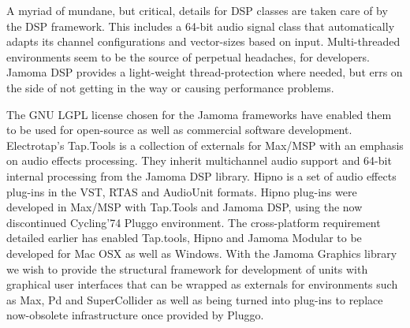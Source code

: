 \documentclass[twoside,10pt]{article}
\begin{document}
A myriad of mundane, but critical, details for DSP classes are taken care of by the DSP framework.  This includes a 64-bit audio signal class that automatically adapts its channel configurations and vector-sizes based on input.  Multi-threaded environments seem to be the source of perpetual headaches, for developers.  Jamoma DSP provides a light-weight thread-protection where needed, but errs on the side of not getting in the way or causing performance problems.




The GNU LGPL license chosen for the Jamoma frameworks have enabled them to be used for open-source as well as commercial software development.  Electrotap's Tap.Tools\cite{web17} is a collection of externals for Max/MSP with an emphasis on audio effects processing.  They inherit multichannel audio support and 64-bit internal processing from the Jamoma DSP library.  Hipno\cite{Place:2005} is a set of audio effects plug-ins in the VST, RTAS and AudioUnit formats.  Hipno plug-ins were developed in Max/MSP with Tap.Tools and Jamoma DSP, using the now discontinued Cycling'74 Pluggo environment.  The cross-platform requirement detailed earlier has enabled Tap.tools, Hipno and Jamoma Modular to be developed for Mac OSX as well as Windows.  With the Jamoma Graphics library we wish to provide the structural framework for development of units with graphical user interfaces that can be wrapped as externals for environments such as Max, Pd and SuperCollider as well as being turned into plug-ins to replace now-obsolete infrastructure once provided by Pluggo.
    
\end{document}
